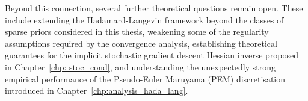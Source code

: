 \documentclass[11pt, twoside]{report}
\begin{document}

Beyond this connection, several further theoretical questions remain open. These include extending the Hadamard-Langevin framework beyond the classes of sparse priors considered in this thesis, weakening some of the regularity assumptions required by the convergence analysis, establishing theoretical guarantees for the implicit stochastic gradient descent Hessian inverse proposed in Chapter~\ref{chp: stoc_cond}, and understanding the unexpectedly strong empirical performance of the Pseudo-Euler Maruyama (PEM) discretisation introduced in Chapter~\ref{chp:analysis_hada_lang}.
\end{document}
